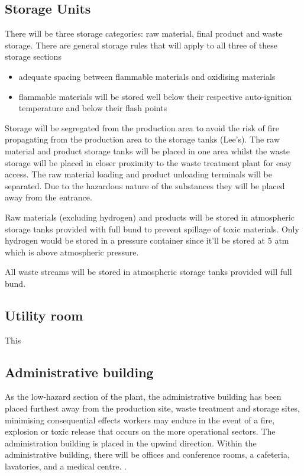 \subsection{Storage Units}

There will be three storage categories: raw material, final product and waste storage. There are general storage rules that will apply to all three of these storage sections 

\begin{itemize}
    \item adequate spacing between flammable materials and oxidising materials 
    \item flammable materials will be stored well below their respective auto-ignition temperature and below their flash points
\end{itemize}

Storage will be segregated from the production area to avoid the risk of fire propagating from the production area to the storage tanks (Lee's). The raw material and product storage tanks will be placed in one area whilst the waste storage will be placed in closer proximity to the waste treatment plant for easy access. The raw material loading and product unloading terminals will be separated. Due to the hazardous nature of the substances they will be placed away from the entrance. 

Raw materials (excluding hydrogen) and products will be stored in atmospheric storage tanks provided with full bund to prevent spillage of toxic materials. Only hydrogen would be stored in a pressure container since it'll be stored at 5 atm which is above atmospheric pressure.  

All waste streams will be stored in atmospheric storage tanks provided will full bund.


\subsection{Utility room}
This 
\subsection{Administrative building}

As the low-hazard section of the plant, the administrative building has been placed furthest away from the production site, waste treatment and storage sites, minimising  consequential effects workers may endure in the event of a fire, explosion or toxic release that occurs on the more operational sectors. The administration building is placed in the upwind direction. Within the administrative building, there will be offices and conference rooms, a cafeteria, lavatories, and a medical centre. \cite{sinnott_coulson_2005}. 